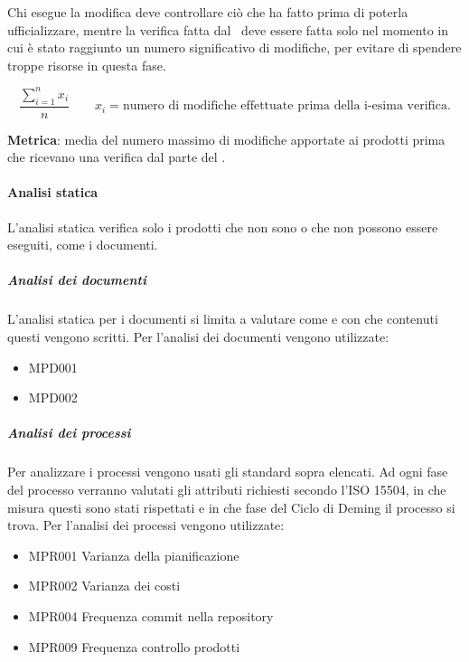				Chi esegue la modifica deve controllare ciò che ha fatto prima di poterla ufficializzare, mentre la verifica fatta dal \Ver\ deve essere fatta solo nel momento in cui è stato raggiunto un numero significativo di modifiche, per evitare di spendere troppe risorse in questa fase.

				\[\dfrac{\sum_{i=1}^{n} x_i}{n} \qquad x_i=\text{numero di modifiche effettuate prima della i-esima verifica.}\]

				\textbf{Metrica}: media del numero massimo di modifiche apportate ai prodotti prima che ricevano una verifica dal parte del \Ver.

			\paragraph{Analisi statica}
			L'analisi statica verifica solo i prodotti che non sono o che non possono essere eseguiti, come i documenti.

				\subparagraph{Analisi dei documenti}
				L'analisi statica per i documenti si limita a valutare come e con che contenuti questi vengono scritti.
				Per l'analisi dei documenti vengono utilizzate:

				\begin{itemize}
					\item MPD001
					\item MPD002
				\end{itemize}


				\subparagraph{Analisi dei processi}
				Per analizzare i processi vengono usati gli standard sopra elencati. Ad ogni fase del processo verranno valutati gli attributi richiesti secondo l'ISO 15504, in che misura questi sono stati rispettati e in che fase del Ciclo di Deming il processo si trova.
				Per l'analisi dei processi vengono utilizzate:

				\begin{itemize}
					\item MPR001 Varianza della pianificazione
					\item MPR002 Varianza dei costi
					\item MPR004 Frequenza commit nella repository
					\item MPR009 Frequenza controllo prodotti
				\end{itemize}





